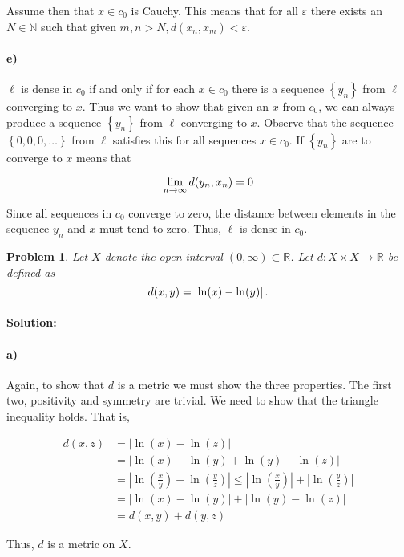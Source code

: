 \documentclass[a4paper]{article}
\newtheorem{prb}{Problem}
\theoremstyle{plain}
\begin{document}
Assume then that $x \in c_{0}$ is Cauchy.
This means that for all $\varepsilon$ there exists an $N \in \mathbb{N}$ such that given $m, n > N, d(x_n, x_m) < \varepsilon$.

\paragraph{e)}

$\ell$ is dense in $c_{0}$ if and only if for each $x \in c_{0}$ there is a
sequence $\left\{ y_n \right\}$ from $\ell$ converging to $x$.  Thus we want to
show that given an $x$ from $c_{0}$, we can always produce a sequence $\left\{
y_{n} \right\}$ from $\ell$ converging to $x$.  Observe that the sequence
$\left\{ 0, 0, 0, \dots \right\}$ from $\ell$ satisfies this for all sequences
$x \in c_{0}$.  If $\left\{ y_n \right\}$ are to converge to $x$ means that

\begin{equation}
  \notag
  \lim\limits_{n\rightarrow \infty} d(y_{n}, x_{n}) = 0
\end{equation}

Since all sequences in $c_{0}$ converge to zero, the distance between elements
in the sequence $y_{n}$ and $x$ must tend to zero. Thus, $\ell$ is dense in
$c_{0}$.

\begin{prb}
  Let $X$ denote the open interval $\left( 0, \infty \right) \subset \mathbb{R}$. Let $d: X \times X \rightarrow \mathbb{R}$ be defined as
  \begin{equation}
    \notag
    d(x, y) = \left|\ln(x) - \ln(y)\right|.
  \end{equation}
\end{prb}

\paragraph{Solution:}
\paragraph{a)}
Again, to show that $d$ is a metric we must show the three properties.
The first two, positivity and symmetry are trivial. We need to show that the triangle inequality holds.
That is,

\begin{align*}
  \label{eq:}
    d(x, z) &= \left|\ln(x) - \ln(z)\right| \\
    &= \left|\ln(x) - \ln(y) + \ln(y) - \ln(z)\right|\\
    &= \left|\ln\left(\frac{x}{y}\right) + \ln\left( \frac{y}{z} \right)\right| \leq \left|\ln\left( \frac{x}{y} \right)\right| + \left|\ln\left( \frac{y}{z} \right)\right| \\
    &= \left|\ln\left( x \right) - \ln\left( y \right)\right| + \left|\ln\left( y \right) - \ln\left( z \right)\right|\\
    &= d(x, y) + d(y, z)
\end{align*}

Thus, $d$ is a metric on $X$. 
\end{document}
